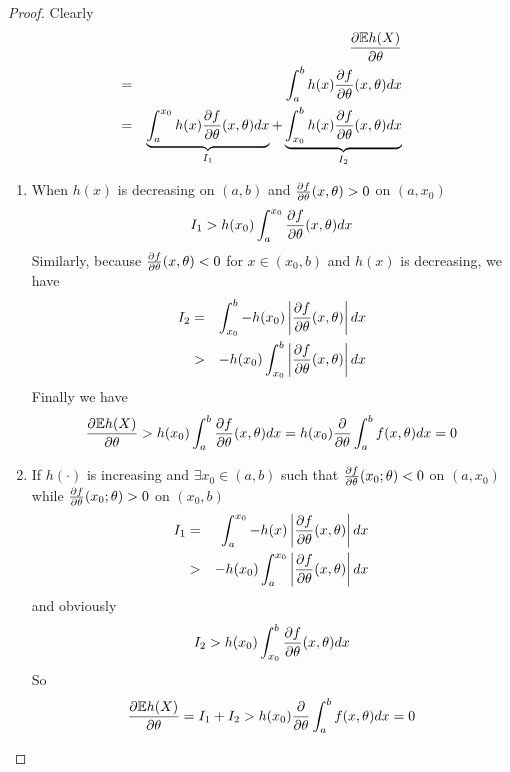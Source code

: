 \documentclass[11pt,a4]{amsart}
\newcommand{\pd}{\partial}
\newcommand{\E }{{\mathbb E}}
\newcommand{\1}{{\mathbf 1}}
\begin{document}
\begin{proof}
  Clearly
  \begin{eqnarray*}
    && {\pd \E h(X) \over \pd \theta} \\
    &=& \int_a^b h(x) {\pd f \over \pd \theta}(x, \theta) dx \\
    &=& \underbrace{\int_a^{x_0} h(x) {\pd f \over \pd \theta}(x,
      \theta) dx}_{I_1}
    + \underbrace{\int_{x_0}^b h(x) {\pd f \over \pd \theta}(x,
      \theta) dx}_{I_2}
  \end{eqnarray*}
  \begin{enumerate}
  \item When $h(x)$ is decreasing on $(a, b)$ and ${\pd f \over \pd
    \theta}(x, \theta) > 0$ on $(a, x_0)$
    \[
    I_1 > h(x_0) \int_a^{x_0} {\pd f \over \pd \theta}(x, \theta) dx
    \]
    Similarly, because ${\pd f \over \pd \theta}(x, \theta) < 0$ for
    $x \in (x_0, b)$ and $h(x)$ is decreasing, we have
    \begin{eqnarray*}
      I_2 &=& \int_{x_0}^b -h(x_0)
      \left|{\pd f \over \pd \theta}(x, \theta) \right| dx \\
      &>& -h(x_0)
      \int_{x_0}^b \left| 
        {\pd f \over \pd \theta}(x, \theta)
      \right| dx
    \end{eqnarray*}
    Finally we have
    \begin{eqnarray*}
      {\pd \E h(X) \over \pd \theta}
      > h(x_0) \int_a^b {\pd f \over \pd \theta}(x, \theta) dx
      = h(x_0) {\partial \over \partial \theta} \int_a^b f(x, \theta) dx
      = 0
    \end{eqnarray*}
  \item If $h(\cdot)$ is increasing and $\exists x_0 \in (a, b)$ such that 
    ${\pd f \over \pd \theta}(x_0; \theta) < 0$ on $(a, x_0)$  while
    ${\pd f \over \pd \theta}(x_0; \theta) > 0$ on $(x_0, b)$
    \begin{eqnarray*}
      I_1 &=&
      \int_a^{x_0} -h(x)
      \left| {\pd f \over \pd \theta}(x, \theta) \right| dx \\
      &>&
      -h(x_0) \int_a^{x_0}
      \left| {\pd f \over \pd \theta}(x, \theta) \right| dx
    \end{eqnarray*}
    and obviously
    \[
    I_2 > h(x_0) \int_{x_0}^b
    {\pd f \over \pd \theta}(x, \theta) dx
    \]
    So
    \[
    {\pd \E h(X) \over \pd \theta}
    = I_1 + I_2
    > h(x_0) {\partial \over \partial \theta} \int_a^b f(x, \theta) dx = 0
    \]
  \end{enumerate}
\end{proof}
\end{document}
